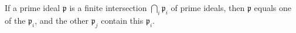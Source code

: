 If a prime ideal $\mathfrak{p}$ is a finite intersection $\bigcap_i \mathfrak{p}_i$ of prime ideals, then $\mathfrak{p}$ equals one of the $\mathfrak{p}_i$, and the other $\mathfrak{p}_j$ contain this $\mathfrak{p}_i$.
